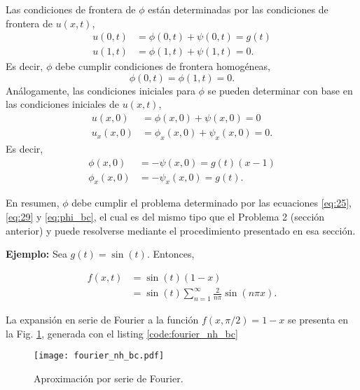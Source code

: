 \documentclass[11pt]{article}
\begin{document}
Las condiciones de frontera de $\phi$ est\'an determinadas por las condiciones de frontera de $u(x,t)$,
\begin{align}
  \label{eq:27}
  u(0,t) &= \phi(0,t) + \psi(0,t) = g(t) \\
  u(1,t) &= \phi(1,t) + \psi(1,t) = 0.
\end{align}
Es decir, $\phi$ debe cumplir condiciones de frontera homog\'eneas,
\begin{equation}
  \label{eq:29}
  \phi(0,t) = \phi(1,t) = 0.
\end{equation}
An\'alogamente, las condiciones iniciales para $\phi$ se pueden determinar con base en las condiciones iniciales de $u(x,t)$,
\begin{align}
  \label{eq:30}
  u(x,0) &= \phi(x,0) + \psi(x,0) = 0 \\
  u_x(x,0) &= \phi_x(x,0) + \psi_x(x,0) = 0.
\end{align}
Es decir,
\begin{align}
  \label{eq:phi_bc}
  \phi(x,0) &= -\psi(x,0) = g(t)(x-1) \\
  \phi_x(x,0) &= -\psi_x(x,0) = g(t).
\end{align}

En resumen, $\phi$ debe cumplir el problema determinado por las ecuaciones \eqref{eq:25}, \eqref{eq:29} y \eqref{eq:phi_bc}, el cual es del mismo tipo que el Problema 2 (secci\'on anterior) y puede resolverse mediante el procedimiento presentado en esa secci\'on.

{\bf Ejemplo:} Sea $g(t) = \sin(t)$. Entonces,

\begin{align}
  \label{eq:32}
  f(x,t) &= \sin(t)(1-x) \\
         &= \sin(t) \sum_{n=1}^\infty \frac{2}{n\pi}\sin(n\pi x).
\end{align}

La expansi\'on en serie de Fourier a la funci\'on  $f(x,\pi/2) = 1-x$ se presenta en la Fig. \ref{fig:fourier_nh_bc}, generada con el listing \ref{code:fourier_nh_bc}

\begin{figure}[h]
  \centering
  \texttt{[image: fourier\_nh\_bc.pdf]}
  \caption{Aproximaci\'on por serie de Fourier.}
  \label{fig:fourier_nh_bc}
\end{figure}



\end{document}

